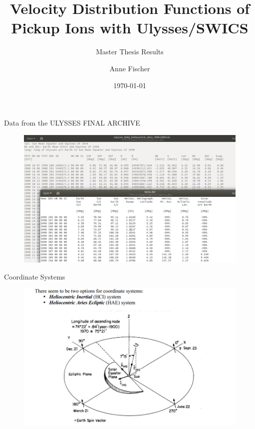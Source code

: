 \documentclass{beamer}
\title{Velocity Distribution Functions of Pickup Ions with Ulysses/SWICS}
\subtitle{Master Thesis Results}
\author{Anne Fischer}
\date{\today}
\begin{document}
\begin{frame}{Data from the ULYSSES FINAL ARCHIVE}
\begin{figure}									
	\includegraphics[width=1.05\textwidth]{Pics/data_files.png}
\end{figure}

\end{frame}

\begin{frame}{Coordinate Systems}
\begin{figure}									
	\includegraphics[width=.9\textwidth]{Pics/HELIO_coordsystems.png}
\end{figure}

\end{frame}
\end{document}
